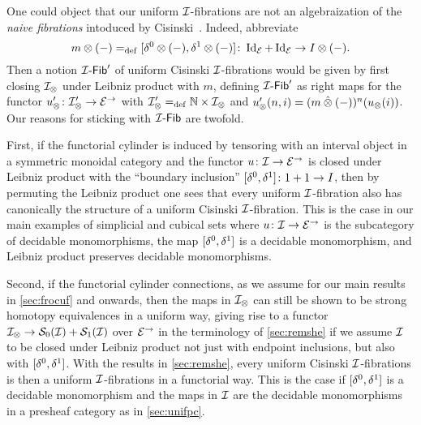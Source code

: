 \documentclass[reqno,10pt,a4paper,oneside,draft]{amsart}
\begin{document}
\begin{remark}
One could object that our uniform $\cal{I}$-fibrations are not an algebraization of the \emph{naive fibrations} intoduced by Cisinski~\cite{cisinski-asterisque}.
Indeed, abbreviate
\[
m \otimes (-) \defeq [\lcyl \otimes (-), \rcyl \otimes (-)] \co \Id_\catE + \Id_\catE \to \interval \otimes (-)
.\]
Then a notion $\Fib[\cal{I}]'$ of uniform Cisinski $\cal{I}$-fibrations would be given by first closing $\cal{I}_\otimes$ under Leibniz product with $m$, \ie defining $\Fib[\cal{I}]'$ as right maps for the functor $u_\otimes' \co \cal{I}_\otimes' \to \catE^\to$ with $\cal{I}_\otimes' \defeq \mathbb{N} \times \cal{I}_\otimes$ and $u_\otimes'(n, i) = (m \hatotimes (-))^n(u_\otimes(i))$.
Our reasons for sticking with $\Fib[\cal{I}]$ are twofold.

First, if the functorial cylinder is induced by tensoring with an interval object in a symmetric monoidal category and the functor $u \co \cal{I} \to \catE^\to$ is closed under Leibniz product with the ``boundary inclusion'' $[\lcyl, \rcyl] \co 1 + 1 \to \interval$, then by permuting the Leibniz product one sees that every uniform $\cal{I}$-fibration also has canonically the structure of a uniform Cisinski $\cal{I}$-fibration.
This is the case in our main examples of simplicial and cubical sets where $u \co \cal{I} \to \catE^\to$ is the subcategory of decidable monomorphisms, the map $[\lcyl, \rcyl]$ is a decidable monomorphism, and Leibniz product preserves decidable monomorphisms.

Second, if the functorial cylinder connections, as we assume for our main results in \cref{sec:frocuf} and onwards, then the maps in $\cal{I}_\otimes$ can still be shown to be strong homotopy equivalences in a uniform way,  giving rise to a functor $\cal{I}_\otimes \to \cal{S}_0(\cal{I}) + \cal{S}_1(\cal{I})$ over $\catE^\to$ in the terminology of \cref{sec:remshe} if we assume $\cal{I}$ to be closed under Leibniz product not just with endpoint inclusions, but also with $[\lcyl, \rcyl]$.
With the results in \cref{sec:remshe}, every uniform Cisinski $\cal{I}$-fibrations is then a uniform $\cal{I}$-fibrations in a functorial way.
This is the case if $[\lcyl, \rcyl]$ is a decidable monomorphism and the maps in $\cal{I}$ are the decidable monomorphisms in a presheaf category as in \cref{sec:unifpc}.
\end{remark}
\end{document}
